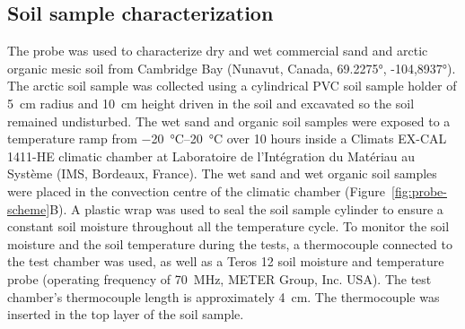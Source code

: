 \subsection{Soil sample characterization}\label{subsec:metho-soil}
The probe was used to characterize dry and wet commercial sand and arctic organic mesic soil from Cambridge Bay (Nunavut, Canada, \ang{69.2275}, \ang{-104,8937}).
The arctic soil sample was collected using a cylindrical PVC soil sample holder of \qty{5}{\cm} radius and \qty{10}{\cm} height driven in the soil and excavated so the soil remained undisturbed.
The wet sand and organic soil samples were exposed to a temperature ramp from \qtyrange{-20}{20}{\degreeCelsius} over 10 hours inside a Climats EX-CAL 1411-HE climatic chamber at Laboratoire de l'Intégration du Matériau au Système (IMS, Bordeaux, France).
The wet sand and wet organic soil samples were placed in the convection centre of the climatic chamber (Figure~\ref{fig:probe-scheme}B).
A plastic wrap was used to seal the soil sample cylinder to ensure a constant soil moisture throughout all the temperature cycle.
To monitor the soil moisture and the soil temperature during the tests, a thermocouple connected to the test chamber was used, as well as a Teros 12 soil moisture and temperature probe (operating frequency of \qty{70}{\mega\hertz}, METER Group, Inc. USA).
The test chamber's thermocouple  length is approximately \qty{4}{\cm}.
The thermocouple was inserted in the top layer of the soil sample.

